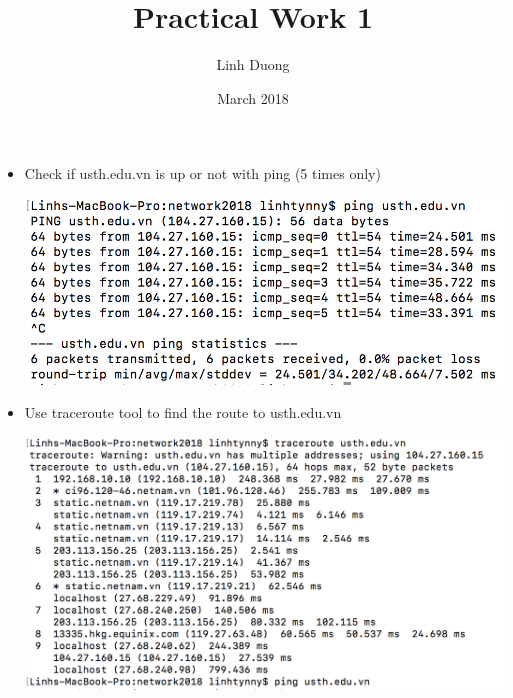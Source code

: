 \documentclass{article}
\title{Practical Work 1}
\author{Linh Duong}
\date{March 2018}
\begin{document}
\maketitle

\begin{itemize}
    \item Check if usth.edu.vn is up or not with ping (5 times only)
    
\includegraphics[width=\linewidth]{ping}

\bigskip


 \item Use traceroute tool to find the route to usth.edu.vn
 
\includegraphics[width=\linewidth]{traceroute}

\end{itemize}
\end{document}
